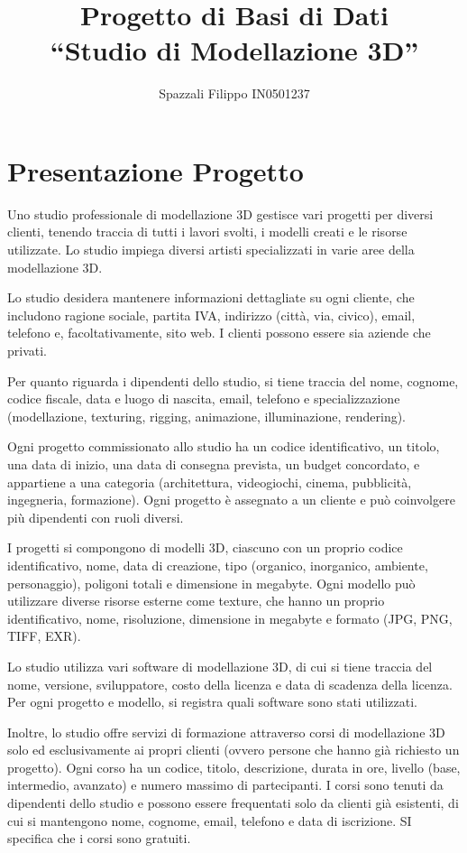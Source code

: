\documentclass[a4paper,11pt]{article}
\author{Spazzali Filippo IN0501237}
\title{\textbf{Progetto di Basi di Dati\\``Studio di Modellazione 3D''}}
\date{}
\begin{document}
{\selectfont
\maketitle

\tableofcontents
\newpage

\section{Presentazione Progetto}
Uno studio professionale di modellazione 3D gestisce vari progetti per diversi clienti, tenendo traccia di tutti i lavori svolti, i modelli creati e le risorse utilizzate. Lo studio impiega diversi artisti specializzati in varie aree della modellazione 3D.

Lo studio desidera mantenere informazioni dettagliate su ogni cliente, che includono ragione sociale, partita IVA, indirizzo (città, via, civico), email, telefono e, facoltativamente, sito web. I clienti possono essere sia aziende che privati.

Per quanto riguarda i dipendenti dello studio, si tiene traccia del nome, cognome, codice fiscale, data e luogo di nascita, email, telefono e specializzazione (modellazione, texturing, rigging, animazione, illuminazione, rendering).

Ogni progetto commissionato allo studio ha un codice identificativo, un titolo, una data di inizio, una data di consegna prevista, un budget concordato, e appartiene a una categoria (architettura, videogiochi, cinema, pubblicità, ingegneria, formazione). Ogni progetto è assegnato a un cliente e può coinvolgere più dipendenti con ruoli diversi.

I progetti si compongono di modelli 3D, ciascuno con un proprio codice identificativo, nome, data di creazione, tipo (organico, inorganico, ambiente, personaggio), poligoni totali e dimensione in megabyte. Ogni modello può utilizzare diverse risorse esterne come texture, che hanno un proprio identificativo, nome, risoluzione, dimensione in megabyte e formato (JPG, PNG, TIFF, EXR).

Lo studio utilizza vari software di modellazione 3D, di cui si tiene traccia del nome, versione, sviluppatore, costo della licenza e data di scadenza della licenza. Per ogni progetto e modello, si registra quali software sono stati utilizzati.

Inoltre, lo studio offre servizi di formazione attraverso corsi di modellazione 3D solo ed esclusivamente ai propri clienti (ovvero persone che hanno già richiesto un progetto). Ogni corso ha un codice, titolo, descrizione, durata in ore, livello (base, intermedio, avanzato) e numero massimo di partecipanti. I corsi sono tenuti da dipendenti dello studio e possono essere frequentati solo da clienti già esistenti, di cui si mantengono nome, cognome, email, telefono e data di iscrizione. SI specifica che i corsi sono gratuiti.

}
\end{document}
